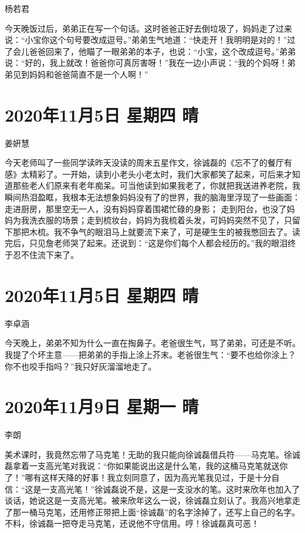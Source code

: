 杨若君

今天晚饭过后，弟弟正在写一个句话。这时爸爸正好去倒垃圾了，妈妈走了过来说：“小宝你这个句号要改成逗号。”弟弟生气地道：“快走开！我明明是对的！”过了会儿爸爸回来了，他瞄了一眼弟弟的本子，也说：“小宝，这个改成逗号。”弟弟说：“好的，我上就改！爸爸你可真厉害呀！”我在一边小声说：“我的个妈呀！弟弟见到妈妈和爸爸简直不是一个人啊！”

\section{2020年11月5日 星期四 晴}

姜姸慧

今天老师叫了一些同学读昨天没读的周末五星作文，徐诚磊的《忘不了的餐厅有感》太精彩了。一开始，读到小老头小老太时，我们大家都笑了起来，可后来才知道那些老人们原来有老年痴呆。可当他读到如果我老了，你就把我送进养老院，我瞬间热泪盈眶，我根本无法想象妈妈没有了的世界，我的脑海里浮现了一些画面：走进厨房，那里空无一人，没有妈妈穿着围裙忙碌的身影；
走到阳台，也没了妈妈为我洗衣服的场景；走到梳妆台，妈妈为我梳着头发，可妈妈突然不见了，只留下那把木梳。我不争气的眼泪马上就要流下来了，可是硬生生的被我憋回去了。读完后，只见詹老师哭了起来。还说到：“这是你们每个人都会经历的。”我的眼泪终于忍不住流下来了。

\section{2020年11月5日 星期四 晴}

李卓涵

今天晚上，弟弟不知为什么一直在掏鼻子。老爸很生气，骂了弟弟，可还是不听。我提了个坏主意——把弟弟的手指上涂上芥末。老爸很生气：“要不也给你涂上？你不也咬手指吗？”我只好灰溜溜地走了。

\section{2020年11月9日 星期一 晴}

李朗

美术课时，我竟然忘带了马克笔！无助的我只能向徐诚磊借兵符——马克笔。徐诚磊拿着一支高光笔对我说：“你如果能说出这是什么笔，我的这桶马克笔就送你了！”哪有这样天降的好事！我立刻同意了，因为高光笔我见过，于是十分自信：“这是一支高光笔！”徐诚磊说不是，这是一支没水的笔。这时来欣年也加入了谈话，她说这是一支高光笔。被来欣年这么一说，徐诚磊立刻认了。我高兴地拿走了那一桶马克笔，还用修正带把上面“徐诚磊”的名字涂掉了，还写上自己的名字。不料，徐诚磊一把夺走马克笔，还说他不守信用。哼！徐诚磊真可恶！

